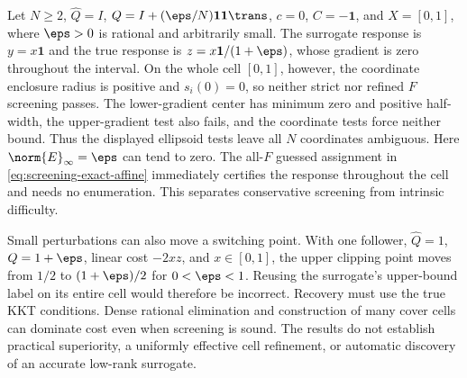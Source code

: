 \begin{example}
\label{ex:screening-conservatism}
Let $N\ge2$, $\widehat Q=I$, $Q=I+(\eps/N)\mathbf1\mathbf1\trans$,
$c=0$, $C=-\mathbf1$, and $X=[0,1]$, where $\eps>0$ is rational
and arbitrarily small. The surrogate response is $y=x\mathbf1$ and
the true response is $z=x\mathbf1/(1+\eps)$, whose gradient is zero
throughout the interval. On the whole cell $[0,1]$, however, the
coordinate enclosure radius is positive and $s_i(0)=0$, so neither
strict nor refined $F$ screening passes. The lower-gradient center
has minimum zero and positive half-width, the upper-gradient test
also fails, and the coordinate tests force neither bound. Thus the
displayed ellipsoid tests leave all $N$ coordinates ambiguous.
Here $\norm{E}_\infty=\eps$ can tend to zero. The all-$F$ guessed
assignment in \eqref{eq:screening-exact-affine} immediately certifies
the response throughout the cell and needs no enumeration. This
separates conservative screening from intrinsic difficulty.
\end{example}

Small perturbations can also move a switching point. With one follower,
$\widehat Q=1$, $Q=1+\eps$, linear cost $-2xz$, and $x\in[0,1]$,
the upper clipping point moves from $1/2$ to $(1+\eps)/2$ for
$0<\eps<1$. Reusing the surrogate's upper-bound label on its entire
cell would therefore be incorrect. Recovery must use the true KKT
conditions. Dense rational elimination and construction of many cover
cells can dominate cost even when screening is sound. The results do
not establish practical superiority, a uniformly effective cell
refinement, or automatic discovery of an accurate low-rank surrogate.
